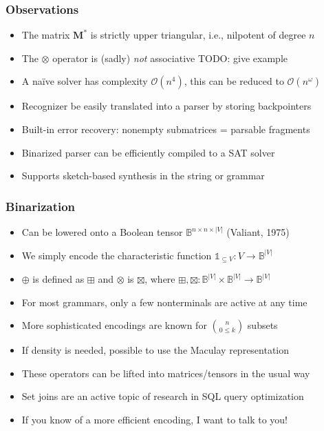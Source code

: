 \documentclass{beamer}
\begin{document}
    \begin{frame}
        \frametitle{Observations}
        \begin{itemize}
            \item The matrix $\mathbf M^*$ is strictly upper triangular, i.e., nilpotent of degree $n$
            \item The $\otimes$ operator is (sadly) \textit{not} associative TODO: give example
            \item A na\"ive solver has complexity $\mathcal{O}(n^4)$, this can be reduced to $\mathcal{O}(n^\omega)$
            \item Recognizer be easily translated into a parser by storing backpointers
            \item Built-in error recovery: nonempty submatrices = parsable fragments
            \item Binarized parser can be efficiently compiled to a SAT solver
            \item Supports sketch-based synthesis in the string or grammar
        \end{itemize}
    \end{frame}

    \begin{frame}
        \frametitle{Binarization}
        \begin{itemize}
            \item Can be lowered onto a Boolean tensor $\mathbb{B}^{n\times n \times |V|}$ (Valiant, 1975)
            \item We simply encode the characteristic function $\mathds{1}_{\subseteq V}: V\rightarrow \mathbb{B}^{|V|}$
            \item $\oplus$ is defined as $\boxplus$ and $\otimes$ is $\boxtimes$, where $\boxplus, \boxtimes: \mathbb{B}^{|V|}\times\mathbb{B}^{|V|} \rightarrow \mathbb{B}^{|V|}$
            \item For most grammars, only a few nonterminals are active at any time
            \item More sophisticated encodings are known for $\binom{n}{0 \leq k}$ subsets
            \item If density is needed, possible to use the Maculay representation
            \item These operators can be lifted into matrices/tensors in the usual way
            \item Set joins are an active topic of research in SQL query optimization
            \item If you know of a more efficient encoding, I want to talk to you!
        \end{itemize}
    \end{frame}
\end{document}
